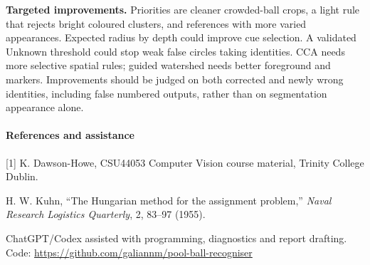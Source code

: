 \documentclass[12pt,a4paper]{article}
\begin{document}

\textbf{Targeted improvements.} Priorities are cleaner crowded-ball crops, a light
rule that rejects bright coloured clusters, and references with more varied
appearances. Expected radius by depth could improve cue selection. A validated
Unknown threshold could stop weak false circles taking identities. CCA needs
more selective spatial rules; guided watershed needs better foreground and markers.
Improvements should be judged on both corrected and newly wrong identities,
including false numbered outputs, rather than on segmentation appearance alone.

\paragraph{References and assistance}
[1] K. Dawson-Howe, CSU44053 Computer Vision course material, Trinity College Dublin.\par
[2] H. W. Kuhn, ``The Hungarian method for the assignment problem,''
\emph{Naval Research Logistics Quarterly}, 2, 83--97 (1955).\par
ChatGPT/Codex assisted with programming, diagnostics and report drafting.\\
Code: \url{https://github.com/galiannm/pool-ball-recogniser}
\end{document}
